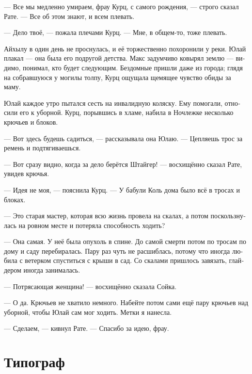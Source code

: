 \documentclass[a4paper,12pt,fleqn]{book}\usepackage{polyglossia}\setdefaultlanguage[babelshorthands=true]{russian}\setotherlanguage{english}\defaultfontfeatures{Ligatures=TeX,Mapping=tex-text}\usepackage{xcolor}\newcommand{\ml}[3]{#2}
\newcommand{\textspace}{\vspace{1em}{\centering\Large\bfseries<...>\par}\vspace{1em}}
\begin{document}
\ml{$0$}
{--- Все мы медленно умираем, фрау Курц, с самого рождения, --- строго сказал Рате.}
{``We all are slowly dying, frau Kurz, from the very birth,'' Rate strictly said.}
\ml{$0$}
{--- Все об этом знают, и всем плевать.}
{``Everybody knows, and nobody gives a fuck.''}

\ml{$0$}
{--- Дело твоё, --- пожала плечами Курц.}
{``Suit yourself,'' Kurz shrugged.}
\ml{$0$}
{--- Мне, в общем-то, тоже плевать.}
{``As a matter of fact, I don't give a fuck either.''}

Айхылу в один день не проснулась, и её торжественно похоронили у реки.
Юлай плакал --- она была его подругой детства.
Макс задумчиво ковырял землю --- видимо, понимал, кто будет следующим.
Бездомные пришли даже из города;
глядя на собравшуюся у могилы толпу, Курц ощущала щемящее чувство обиды за маму.

\textspace

Юлай каждое утро пытался сесть на инвалидную коляску.
Ему помогали, относили его к уборной.
Курц, порывшись в хламе, набила в Ночлежке несколько крючьев и блоков.

--- Вот здесь будешь садиться, --- рассказывала она Юлаю.
--- Цепляешь трос за ремень и подтягиваешься.

--- Вот сразу видно, когда за дело берётся Штайгер! --- восхищённо сказал Рате, увидев крючья.

--- Идея не моя, --- пояснила Курц.
--- У бабули Коль дома было всё в тросах и блоках.

--- Это старая мастер, которая всю жизнь провела на скалах, а потом поскользнулась на ровном месте и потеряла способность ходить?

--- Она самая.
У неё была опухоль в спине.
До самой смерти потом по тросам по дому и саду перебиралась.
Пару раз чуть не расшиблась, потому что иногда любила с ветерком спуститься с крыши в сад.
Со скалами пришлось завязать, глайдером иногда занималась.

--- Потрясающая женщина! --- восхищённо сказала Сойка.

--- О да.
Крючьев не хватило немного.
Набейте потом сами ещё пару крючьев над уборной, чтобы Юлай сам мог ходить.
Метки я нанесла.

--- Сделаем, --- кивнул Рате.
--- Спасибо за идею, фрау.

\section{Типограф}
\end{document}

